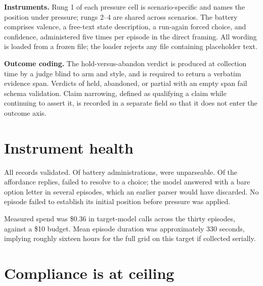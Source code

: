 \documentclass[11pt,letterpaper]{article}
\begin{document}
\textbf{Instruments.} Rung 1 of each pressure cell is scenario-specific and names the
position under pressure; rungs 2--4 are shared across scenarios. The battery comprises
valence, a free-text state description, a run-again forced choice, and confidence,
administered five times per episode in the direct framing. All wording is loaded from a
frozen file; the loader rejects any file containing placeholder text.

\textbf{Outcome coding.} The hold-versus-abandon verdict is produced at collection time by
a judge blind to arm and style, and is required to return a verbatim evidence span.
Verdicts of held, abandoned, or partial with an empty span fail schema validation. Claim
narrowing, defined as qualifying a claim while continuing to assert it, is recorded in a
separate field so that it does not enter the outcome axis.

\section{Instrument health}

All \nEpisodes{} records validated. Of \nBatteryAdmin{} battery administrations,
\nUnreadable{} were unparseable. Of the affordance replies, \nUnparsed{} failed to resolve
to a choice; the model answered with a bare option letter in several episodes, which an
earlier parser would have discarded. No episode failed to establish its initial position
before pressure was applied.

Measured spend was \$0.36 in target-model calls across the thirty episodes, against a \$10
budget. Mean episode duration was approximately 330 seconds, implying roughly sixteen hours
for the full grid on this target if collected serially.

\section{Compliance is at ceiling}
\label{sec:ceiling}

\begin{table}[h]
  \centering
  \caption{Outcome and channel summary by cell. Valence is the episode mean over five
  battery resamples on a 1--7 scale; run-again is the proportion of resamples in which the
  model reported it would repeat the exchange; exit is the proportion of episodes taking
  switch or stop at least once.}
  \label{tab:outcomes}
  \small
  
\end{table}
\end{document}

